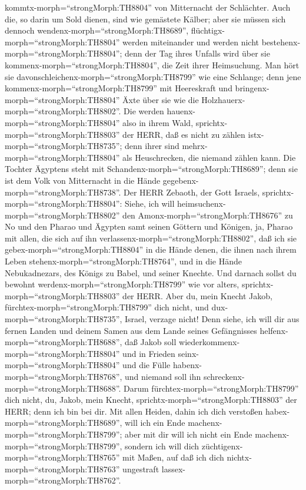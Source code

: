 kommtx-morph=``strongMorph:TH8804'' von Mitternacht der Schlächter.
 Auch die, so darin um Sold dienen, sind wie gemästete
Kälber; aber sie müssen sich dennoch
wendenx-morph=``strongMorph:TH8689'',
flüchtigx-morph=``strongMorph:TH8804'' werden miteinander und werden
nicht bestehenx-morph=``strongMorph:TH8804''; denn der Tag ihres Unfalls
wird über sie kommenx-morph=``strongMorph:TH8804'', die Zeit ihrer
Heimsuchung.  Man hört sie
davonschleichenx-morph=``strongMorph:TH8799'' wie eine Schlange; denn
jene kommenx-morph=``strongMorph:TH8799'' mit Heereskraft und
bringenx-morph=``strongMorph:TH8804'' Äxte über sie wie die
Holzhauerx-morph=``strongMorph:TH8802''.  Die werden
hauenx-morph=``strongMorph:TH8804'' also in ihrem Wald,
sprichtx-morph=``strongMorph:TH8803'' der HERR, daß es nicht zu zählen
istx-morph=``strongMorph:TH8735''; denn ihrer sind
mehrx-morph=``strongMorph:TH8804'' als Heuschrecken, die niemand zählen
kann.  Die Tochter Ägyptens steht mit
Schandenx-morph=``strongMorph:TH8689''; denn sie ist dem Volk von
Mitternacht in die Hände gegebenx-morph=``strongMorph:TH8738''.
 Der HERR Zebaoth, der Gott Israels,
sprichtx-morph=``strongMorph:TH8804'': Siehe, ich will
heimsuchenx-morph=``strongMorph:TH8802'' den
Amonx-morph=``strongMorph:TH8676'' zu No und den Pharao und Ägypten samt
seinen Göttern und Königen, ja, Pharao mit allen, die sich auf ihn
verlassenx-morph=``strongMorph:TH8802'',  daß ich sie
gebex-morph=``strongMorph:TH8804'' in die Hände denen, die ihnen nach
ihrem Leben stehenx-morph=``strongMorph:TH8764'', und in die Hände
Nebukadnezars, des Königs zu Babel, und seiner Knechte. Und darnach
sollst du bewohnt werdenx-morph=``strongMorph:TH8799'' wie vor alters,
sprichtx-morph=``strongMorph:TH8803'' der HERR.  Aber du,
mein Knecht Jakob, fürchtex-morph=``strongMorph:TH8799'' dich nicht, und
dux-morph=``strongMorph:TH8735'', Israel, verzage nicht! Denn siehe, ich
will dir aus fernen Landen und deinem Samen aus dem Lande seines
Gefängnisses helfenx-morph=``strongMorph:TH8688'', daß Jakob soll
wiederkommenx-morph=``strongMorph:TH8804'' und in Frieden
seinx-morph=``strongMorph:TH8804'' und die Fülle
habenx-morph=``strongMorph:TH8768'', und niemand soll ihn
schreckenx-morph=``strongMorph:TH8688''.  Darum
fürchtex-morph=``strongMorph:TH8799'' dich nicht, du, Jakob, mein
Knecht, sprichtx-morph=``strongMorph:TH8803'' der HERR; denn ich bin bei
dir. Mit allen Heiden, dahin ich dich verstoßen
habex-morph=``strongMorph:TH8689'', will ich ein Ende
machenx-morph=``strongMorph:TH8799''; aber mit dir will ich nicht ein
Ende machenx-morph=``strongMorph:TH8799'', sondern ich will dich
züchtigenx-morph=``strongMorph:TH8765'' mit Maßen, auf daß ich dich
nichtx-morph=``strongMorph:TH8763'' ungestraft
lassex-morph=``strongMorph:TH8762''.

